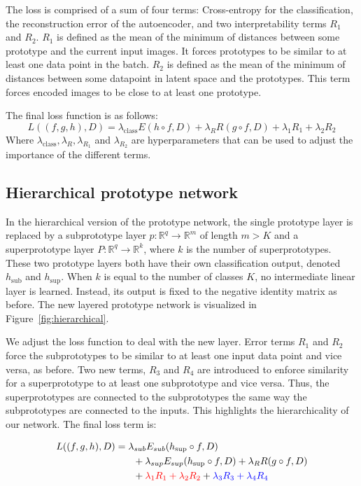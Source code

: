 The loss is comprised of a sum of four terms: Cross-entropy for the classification, the reconstruction error of the autoencoder, and two interpretability terms $R_1$ and $R_2$. $R_1$ is defined as the mean of the minimum of distances between some prototype and the current input images. It forces prototypes to be similar to at least one data point in the batch. $R_2$ is defined as the mean of the minimum of distances between some datapoint in latent space and the prototypes. This term forces encoded images to be close to at least one prototype.

The final loss function is as follows:
\begin{equation}  L((f,g,h),D) = \lambda_{\text{class}}E(h \circ f, D) + \lambda_R R(g \circ f,D) + \lambda_1 R_1 + \lambda_2 R_2 \label{eq:ogloss}\end{equation}
Where $\lambda_{\text{class}}, \lambda_{R}, \lambda_{R_1}$ and $\lambda_{R_2}$ are hyperparameters that can be used to adjust the importance of the different terms. 

\subsection{Hierarchical prototype network}

In the hierarchical version of the prototype network, the single prototype layer is replaced by a subprototype layer $p : \mathbb{R}^q\rightarrow \mathbb{R}^m$ of length $m > K$ and a superprototype layer $P:\mathbb{R}^{q}\rightarrow\mathbb{R}^{k}$, where $k$ is the number of superprototypes. These two prototype layers both have their own classification output, denoted $h_{\text{sub}}$ and $h_{\text{sup}}$. When $k$ is equal to the number of classes $K$, no intermediate linear layer is learned. Instead, its output is fixed to the negative identity matrix as before. The new layered prototype network is visualized in Figure~\ref{fig:hierarchical}. 

We adjust the loss function to deal with the new layer. Error terms $R_1$ and $R_2$ force the subprototypes to be similar to at least one input data point and vice versa, as before. Two new terms, $R_3$ and $R_4$ are introduced to enforce similarity for a superprototype to at least one subprototype and vice versa. Thus, the superprototypes are connected to the subprototypes the same way the subprototypes are connected to the inputs. This highlights the hierarchicality of our network. The final loss term is:

\begin{align}
    L((f,g,h),D) &= \lambda_{sub} E_{sub}(h_{\text{sup}} \circ f, D)\label{eq:hierloss}\\ &\phantom{{}=1}+ \lambda_{sup} E_{sup}(h_{\text{sup}} \circ f, D)
    + \lambda_R R(g \circ f,D)\notag\\ &\phantom{{}=1}+ {\color{red}\lambda_1 R_1 + \lambda_2 R_2}  + {\color{blue}\lambda_3 R_3 + \lambda_4 R_4}\notag
\end{align}

